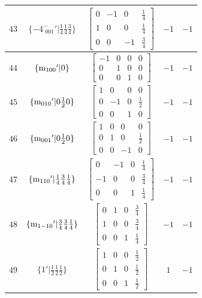 \documentclass[fleqn,8pt]{jsarticle}
\begin{document}
\begin{longtable}{ccccc}
$ 43 $ & $ \{-4^{-}_{\,\,001}{}'|\frac{1}{4} \frac{1}{4} \frac{3}{4}\} $ & $ \begin{bmatrix} 0 & -1 & 0 & \frac{1}{4} \\ 1 & 0 & 0 & \frac{1}{4} \\ 0 & 0 & -1 & \frac{3}{4} \end{bmatrix} $ & $ -1 $ & $ -1 $ \\ \hline
$ 44 $ & $ \{{\rm m}_{100}{}'|0\} $ & $ \begin{bmatrix} -1 & 0 & 0 & 0 \\ 0 & 1 & 0 & 0 \\ 0 & 0 & 1 & 0 \end{bmatrix} $ & $ -1 $ & $ -1 $ \\ \hline
$ 45 $ & $ \{{\rm m}_{010}{}'|0 \frac{1}{2} 0\} $ & $ \begin{bmatrix} 1 & 0 & 0 & 0 \\ 0 & -1 & 0 & \frac{1}{2} \\ 0 & 0 & 1 & 0 \end{bmatrix} $ & $ -1 $ & $ -1 $ \\ \hline
$ 46 $ & $ \{{\rm m}_{001}{}'|0 \frac{1}{2} 0\} $ & $ \begin{bmatrix} 1 & 0 & 0 & 0 \\ 0 & 1 & 0 & \frac{1}{2} \\ 0 & 0 & -1 & 0 \end{bmatrix} $ & $ -1 $ & $ -1 $ \\ \hline
$ 47 $ & $ \{{\rm m}_{110}{}'|\frac{1}{4} \frac{3}{4} \frac{1}{4}\} $ & $ \begin{bmatrix} 0 & -1 & 0 & \frac{1}{4} \\ -1 & 0 & 0 & \frac{3}{4} \\ 0 & 0 & 1 & \frac{1}{4} \end{bmatrix} $ & $ -1 $ & $ -1 $ \\ \hline
$ 48 $ & $ \{{\rm m}_{1-10}{}'|\frac{3}{4} \frac{3}{4} \frac{1}{4}\} $ & $ \begin{bmatrix} 0 & 1 & 0 & \frac{3}{4} \\ 1 & 0 & 0 & \frac{3}{4} \\ 0 & 0 & 1 & \frac{1}{4} \end{bmatrix} $ & $ -1 $ & $ -1 $ \\ \hline
$ 49 $ & $ \{1{}'|\frac{1}{2} \frac{1}{2} \frac{1}{2}\} $ & $ \begin{bmatrix} 1 & 0 & 0 & \frac{1}{2} \\ 0 & 1 & 0 & \frac{1}{2} \\ 0 & 0 & 1 & \frac{1}{2} \end{bmatrix} $ & $ 1 $ & $ -1 $ \\ \hline

\end{longtable}
\end{document}
